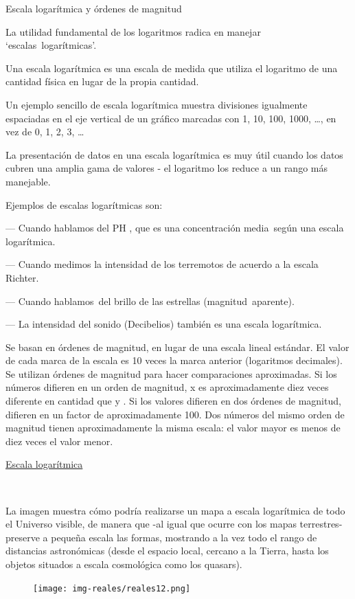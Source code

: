 \begin{myexampleblock}{Escala logarítmica y órdenes de magnitud}
	
La utilidad fundamental de los logaritmos radica en manejar `escalas logarítmicas’. 

\vspace{2mm} Una escala logarítmica es una escala de medida que utiliza el logaritmo de una cantidad física en lugar de la propia cantidad.

\vspace{2mm} Un ejemplo sencillo de escala logarítmica muestra divisiones igualmente espaciadas en el eje vertical de un gráfico marcadas con 1, 10, 100, 1000, …, en vez de 0, 1, 2, 3, …

\vspace{2mm} La presentación de datos en una escala logarítmica es muy útil cuando los datos cubren una amplia gama de valores - el logaritmo los reduce a un rango más manejable.

\vspace{2mm} Ejemplos de escalas logarítmicas son:

--- Cuando hablamos del PH , que es una concentración media según una escala logarítmica.

--- Cuando medimos la intensidad de los terremotos de acuerdo a la escala Richter.

--- Cuando hablamos del brillo de las estrellas (magnitud aparente).

--- La intensidad del sonido (Decibelios) también es una escala logarítmica.

\vspace{2mm}
Se basan en órdenes de magnitud, en lugar de una escala lineal estándar. El valor de cada marca de la escala es 10 veces la marca anterior (logaritmos decimales). Se utilizan órdenes de magnitud para hacer comparaciones aproximadas. Si los números difieren en un orden de magnitud, x es aproximadamente diez veces diferente en cantidad que y . Si los valores difieren en dos órdenes de magnitud, difieren en un factor de aproximadamente 100. Dos números del mismo orden de magnitud tienen aproximadamente la misma escala: el valor mayor es menos de diez veces el valor menor.

\underline{Escala logarítmica}

\begin{multicols}{2}
$\quad$

La imagen muestra cómo podría realizarse un mapa a escala logarítmica de todo el Universo visible, de manera que -al igual que ocurre con los mapas terrestres- preserve a pequeña escala las formas, mostrando a la vez todo el rango de distancias astronómicas (desde el espacio local, cercano a la Tierra, hasta los objetos situados a escala cosmológica como los quasars).
\begin{figure}[H]
	\centering
	\texttt{[image: img-reales/reales12.png]}
	\end{figure}
\end{multicols}


\end{myexampleblock}
